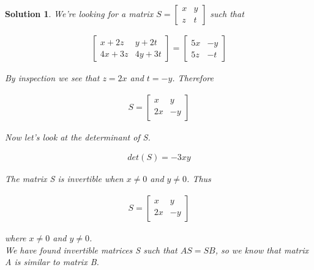 \documentclass{article}
\newtheorem*{solution}{Solution}
\begin{document}
\begin{solution}
We're looking for a matrix $S = \begin{bmatrix} x & y \\ z & t \end{bmatrix}$ such that

\begin{align*}
\begin{bmatrix}x + 2z & y + 2t \\ 4x + 3z & 4y + 3t\end{bmatrix} = \begin{bmatrix}5x & -y \\ 5z & -t\end{bmatrix}
\end{align*}

By inspection we see that $z = 2x$ and $t = -y$. Therefore

\begin{align*}
S = \begin{bmatrix} x & y \\ 2x & -y \end{bmatrix} 
\end{align*}

Now let's look at the determinant of S.

\begin{align*}
det(S) = -3xy
\end{align*}

The matrix S is invertible when $x \neq 0$ and $y \neq 0$. Thus 

\begin{align*}
S = \begin{bmatrix} x & y \\ 2x & -y \end{bmatrix} 
\end{align*}

where $x \neq 0$ and $y \neq 0$. \\

We have found invertible matrices S such that $AS = SB$, so we know that matrix A is similar to matrix B. 

\end{solution}
\end{document}
